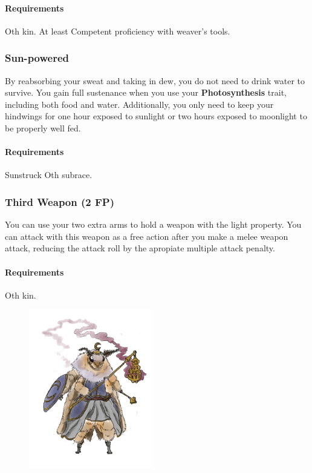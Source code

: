         \paragraph{Requirements} Oth kin. At least Competent proficiency with weaver's tools.
    \subsubsection{Sun-powered} \label{feat::sunpowered}
        By reabsorbing your sweat and taking in dew, you do not need to drink water to survive.
        You gain full sustenance when you use your \textbf{Photosynthesis} trait, including both food and water.
        Additionally, you only need to keep your hindwings for one hour exposed to sunlight or two hours exposed to moonlight to be properly well fed.
        \paragraph{Requirements} Sunstruck Oth subrace.
    \subsubsection{Third Weapon (2 FP)} \label{feat::thirdweapon}
        You can use your two extra arms to hold a weapon with the light property.
        You can attack with this weapon as a free action after you make a melee weapon attack, reducing the attack roll by the apropiate multiple attack penalty.
        \paragraph{Requirements} Oth kin.

\begin{figure}[!t]
    \centering
    \includegraphics[width=0.48\textwidth]{04kins/img/14oth_cleric.png}
\end{figure}

